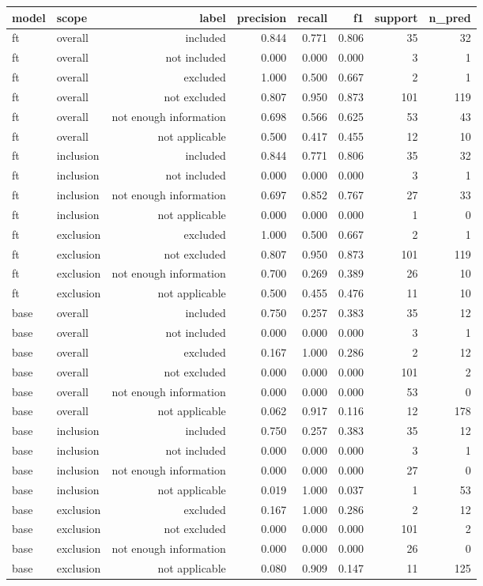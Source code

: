 \begin{tabular}{llrrrrrr}
\toprule
model & scope & label & precision & recall & f1 & support & n\_pred \\
\midrule
ft & overall & included & 0.844 & 0.771 & 0.806 & 35 & 32 \\
ft & overall & not included & 0.000 & 0.000 & 0.000 & 3 & 1 \\
ft & overall & excluded & 1.000 & 0.500 & 0.667 & 2 & 1 \\
ft & overall & not excluded & 0.807 & 0.950 & 0.873 & 101 & 119 \\
ft & overall & not enough information & 0.698 & 0.566 & 0.625 & 53 & 43 \\
ft & overall & not applicable & 0.500 & 0.417 & 0.455 & 12 & 10 \\
ft & inclusion & included & 0.844 & 0.771 & 0.806 & 35 & 32 \\
ft & inclusion & not included & 0.000 & 0.000 & 0.000 & 3 & 1 \\
ft & inclusion & not enough information & 0.697 & 0.852 & 0.767 & 27 & 33 \\
ft & inclusion & not applicable & 0.000 & 0.000 & 0.000 & 1 & 0 \\
ft & exclusion & excluded & 1.000 & 0.500 & 0.667 & 2 & 1 \\
ft & exclusion & not excluded & 0.807 & 0.950 & 0.873 & 101 & 119 \\
ft & exclusion & not enough information & 0.700 & 0.269 & 0.389 & 26 & 10 \\
ft & exclusion & not applicable & 0.500 & 0.455 & 0.476 & 11 & 10 \\
base & overall & included & 0.750 & 0.257 & 0.383 & 35 & 12 \\
base & overall & not included & 0.000 & 0.000 & 0.000 & 3 & 1 \\
base & overall & excluded & 0.167 & 1.000 & 0.286 & 2 & 12 \\
base & overall & not excluded & 0.000 & 0.000 & 0.000 & 101 & 2 \\
base & overall & not enough information & 0.000 & 0.000 & 0.000 & 53 & 0 \\
base & overall & not applicable & 0.062 & 0.917 & 0.116 & 12 & 178 \\
base & inclusion & included & 0.750 & 0.257 & 0.383 & 35 & 12 \\
base & inclusion & not included & 0.000 & 0.000 & 0.000 & 3 & 1 \\
base & inclusion & not enough information & 0.000 & 0.000 & 0.000 & 27 & 0 \\
base & inclusion & not applicable & 0.019 & 1.000 & 0.037 & 1 & 53 \\
base & exclusion & excluded & 0.167 & 1.000 & 0.286 & 2 & 12 \\
base & exclusion & not excluded & 0.000 & 0.000 & 0.000 & 101 & 2 \\
base & exclusion & not enough information & 0.000 & 0.000 & 0.000 & 26 & 0 \\
base & exclusion & not applicable & 0.080 & 0.909 & 0.147 & 11 & 125 \\
\bottomrule
\end{tabular}

